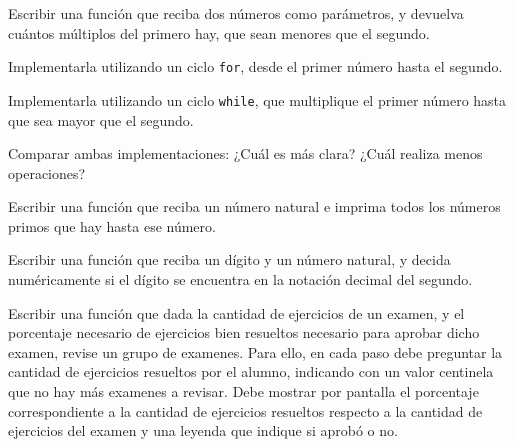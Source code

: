 \begin{ejercicio}
Escribir una función que reciba dos números como parámetros, y
devuelva cuántos múltiplos del primero hay, que sean menores que el
segundo.
\begin{partes}
    \item Implementarla utilizando un ciclo \verb!for!, desde el primer número
hasta el segundo.
    \item Implementarla utilizando un ciclo \verb!while!, que multiplique el primer
número hasta que sea mayor que el segundo.
    \item Comparar ambas implementaciones: ¿Cuál es más clara? ¿Cuál realiza menos
operaciones?
\end{partes}
\end{ejercicio}

\begin{ejercicio}
Escribir una función que reciba un número natural e imprima todos
los números primos que hay hasta ese número.
\end{ejercicio}

\begin{ejercicio}
Escribir una función que reciba un dígito y un número natural, y
decida numéricamente si el dígito se encuentra en la notación decimal
del segundo.
\end{ejercicio}

\begin{ejercicio}
Escribir una función que dada la cantidad de ejercicios de un examen,
y el porcentaje necesario de ejercicios bien resueltos necesario para aprobar
dicho examen, revise un grupo de examenes. Para ello, en cada paso debe
preguntar la cantidad de ejercicios resueltos por el alumno, indicando con un
valor centinela que no hay más examenes a revisar. Debe mostrar por pantalla
el porcentaje correspondiente a la cantidad de ejercicios resueltos respecto a
la cantidad de ejercicios del examen y una leyenda que indique si aprobó o no.
\end{ejercicio}
